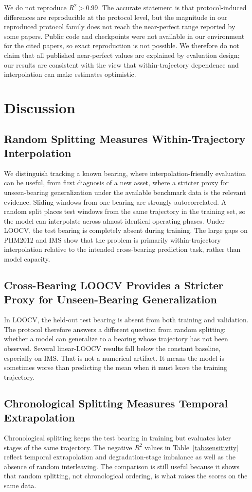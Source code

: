 \documentclass[pdflatex,sn-mathphys-num]{sn-jnl}
\begin{document}
We do not reproduce $R^2>0.99$. The accurate statement is that protocol-induced differences are reproducible at the protocol level, but the magnitude in our reproduced protocol family does not reach the near-perfect range reported by some papers. Public code and checkpoints were not available in our environment for the cited papers, so exact reproduction is not possible. We therefore do not claim that all published near-perfect values are explained by evaluation design; our results are consistent with the view that within-trajectory dependence and interpolation can make estimates optimistic.

\section{Discussion}
\subsection{Random Splitting Measures Within-Trajectory Interpolation}
We distinguish tracking a known bearing, where interpolation-friendly evaluation can be useful, from first diagnosis of a new asset, where a stricter proxy for unseen-bearing generalization under the available benchmark data is the relevant evidence. Sliding windows from one bearing are strongly autocorrelated. A random split places test windows from the same trajectory in the training set, so the model can interpolate across almost identical operating phases. Under LOOCV, the test bearing is completely absent during training. The large gaps on PHM2012 and IMS show that the problem is primarily within-trajectory interpolation relative to the intended cross-bearing prediction task, rather than model capacity.

\subsection{Cross-Bearing LOOCV Provides a Stricter Proxy for Unseen-Bearing Generalization}
In LOOCV, the held-out test bearing is absent from both training and validation. The protocol therefore answers a different question from random splitting: whether a model can generalize to a bearing whose trajectory has not been observed. Several linear-LOOCV results fall below the constant baseline, especially on IMS. That is not a numerical artifact. It means the model is sometimes worse than predicting the mean when it must leave the training trajectory.

\subsection{Chronological Splitting Measures Temporal Extrapolation}
Chronological splitting keeps the test bearing in training but evaluates later stages of the same trajectory. The negative $R^2$ values in Table~\ref{tab:sensitivity} reflect temporal extrapolation and degradation-stage imbalance as well as the absence of random interleaving. The comparison is still useful because it shows that random splitting, not chronological ordering, is what raises the scores on the same data.
\end{document}
